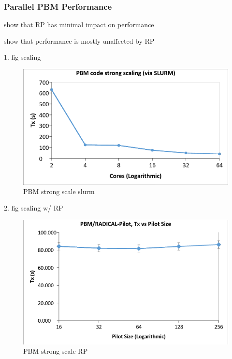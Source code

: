 \documentclass[preprint,11pt,authoryear]{elsarticle}
\begin{document}
	    \subsubsection{Parallel PBM Performance}
	     \par show that RP has minimal impact on performance 
	    \par show that performance is mostly unaffected by RP 
	    \par 1. fig scaling 
	      \begin{figure}[H]
	      \centering
	      \includegraphics[scale=0.5]{rslts_strong_scale_slurm}
	      \caption{ PBM strong scale slurm}
	      \label{fig:rslts_pbm_strong_scale}
	      \end{figure}
	    \par 2. fig scaling w/ RP  
	      \begin{figure}[H]
	      \centering
	      \includegraphics[scale=0.5]{rslts_pbmbyrp_strng}
	      \caption{ PBM strong scale RP}
	      \label{fig:rslts_pbmbyrp_strng}
	      \end{figure} 
	      
\end{document}
